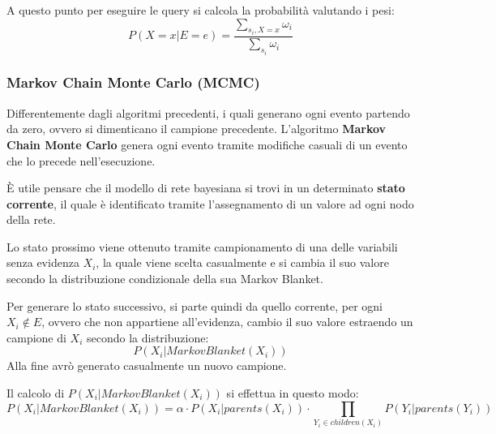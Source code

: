 A questo punto per eseguire le query si calcola la probabilità valutando i pesi:
\begin{equation*}
    P(X = x | E = e) = \frac{\sum_{s_i, X=x} \omega_i}{\sum_{s_i} \omega_i}
\end{equation*}
\subsubsection{Markov Chain Monte Carlo (MCMC)}
Differentemente dagli algoritmi precedenti, i quali generano ogni evento partendo
da zero, ovvero si dimenticano il campione precedente. L'algoritmo \textbf{Markov
    Chain Monte Carlo} genera ogni evento tramite modifiche casuali di un evento
che lo precede nell'esecuzione.

È utile pensare che il modello di rete bayesiana si trovi in un determinato
\textbf{stato corrente}, il quale è identificato tramite l'assegnamento di un
valore ad ogni nodo della rete.

Lo stato prossimo viene ottenuto tramite campionamento di una delle variabili
senza evidenza $X_i$, la quale viene scelta casualmente e si cambia il suo
valore secondo la distribuzione condizionale della sua Markov Blanket.

Per generare lo stato successivo, si parte quindi da quello corrente, per ogni
$X_i \not \in E$, ovvero che non appartiene all'evidenza, cambio il suo valore
estraendo un campione di $X_i$ secondo la distribuzione:
\begin{equation*}
    P(X_i | MarkovBlanket(X_i))
\end{equation*}
Alla fine avrò generato casualmente un nuovo campione.

Il calcolo di $P(X_i | MarkovBlanket(X_i))$ si effettua in questo modo:
\begin{equation}
    P(X_i | MarkovBlanket(X_i)) = \alpha \cdot P(X_i | parents(X_i)) \cdot
    \prod_{Y_i\in children(X_i)} P(Y_i| parents(Y_i))
\end{equation}
